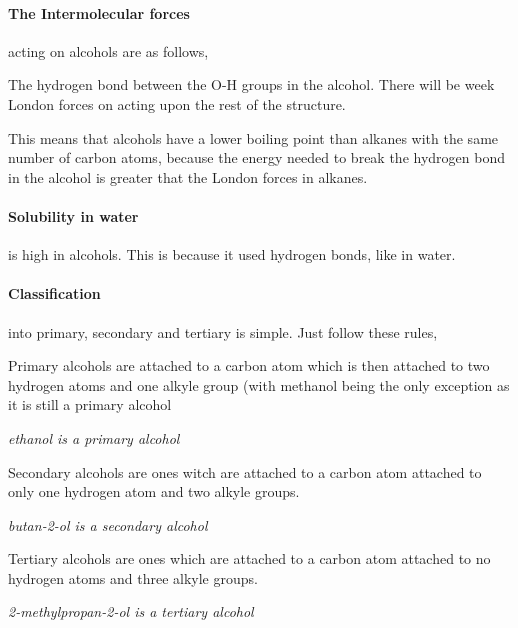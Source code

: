 	\paragraph{The Intermolecular forces} acting on alcohols are as follows,
	
	The hydrogen bond between the O-H groups in the alcohol. There will be week London forces on acting upon the rest of the structure.
	
	This means that alcohols have a lower boiling point than alkanes with the same number of carbon atoms, because the energy needed to break the hydrogen bond in the alcohol is greater that the London forces in alkanes.
	
	\paragraph{Solubility in water} is high in alcohols.
	This is because it used hydrogen bonds, like in water.
	
	\paragraph{Classification} into primary, secondary and tertiary is simple. Just follow these rules,
	
	Primary alcohols are attached to a carbon atom which is then attached to two hydrogen atoms and one alkyle group (with methanol being the only exception as it is still a primary alcohol
	\begin{center}
		
		\vspace{7mm}
		
		\textit{ethanol is a primary alcohol}
	\end{center}
	
	Secondary alcohols are ones witch are attached to a carbon atom attached to only one hydrogen atom and two alkyle groups.
	\begin{center}
		
		\vspace{7mm}
		
		\textit{butan-2-ol is a secondary alcohol}
	\end{center}
	
	Tertiary alcohols are ones which are attached to a carbon atom attached to no hydrogen atoms and three alkyle groups.
	\begin{center}
		
		\vspace{7mm}
		
		\textit{2-methylpropan-2-ol is a tertiary alcohol}
	\end{center}
	
